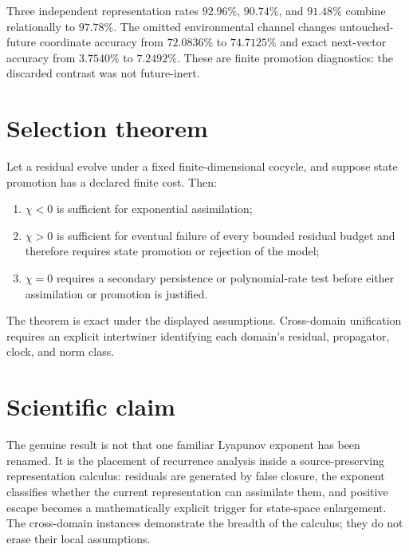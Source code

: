 \documentclass[11pt,a4paper]{article}
\begin{document}
Three independent representation rates $92.96\%$, $90.74\%$, and $91.48\%$ combine relationally to $97.78\%$. The omitted environmental channel changes untouched-future coordinate accuracy from $72.0836\%$ to $74.7125\%$ and exact next-vector accuracy from $3.7540\%$ to $7.2492\%$. These are finite promotion diagnostics: the discarded contrast was not future-inert.

\section{Selection theorem}
\begin{theorem}
Let a residual evolve under a fixed finite-dimensional cocycle, and suppose state promotion has a declared finite cost. Then:
\begin{enumerate}
\item $\chi<0$ is sufficient for exponential assimilation;
\item $\chi>0$ is sufficient for eventual failure of every bounded residual budget and therefore requires state promotion or rejection of the model;
\item $\chi=0$ requires a secondary persistence or polynomial-rate test before either assimilation or promotion is justified.
\end{enumerate}
\end{theorem}
The theorem is exact under the displayed assumptions. Cross-domain unification requires an explicit intertwiner identifying each domain's residual, propagator, clock, and norm class.

\section{Scientific claim}
The genuine result is not that one familiar Lyapunov exponent has been renamed. It is the placement of recurrence analysis inside a source-preserving representation calculus: residuals are generated by false closure, the exponent classifies whether the current representation can assimilate them, and positive escape becomes a mathematically explicit trigger for state-space enlargement. The cross-domain instances demonstrate the breadth of the calculus; they do not erase their local assumptions.
\end{document}
